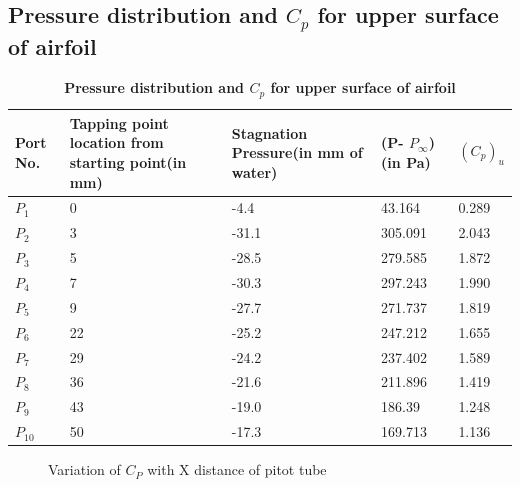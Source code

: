 \documentclass[12pt,a4paper]{article}
\begin{document}
\subsection{Pressure distribution and $C_p$ for upper surface of airfoil }
\begin{table}[ht]
\centering
\caption{\textbf{Pressure distribution and $C_p$ for upper surface of airfoil }}
\vspace{2mm}

\begin{tabular}{|p{10mm}|p{20mm}|p{20mm}|p{20mm}|p{20mm}|} 
 \hline
Port No. & Tapping point location from starting point(in mm) & Stagnation Pressure(in mm of water) & (P- $P_{\infty}$)(in Pa) &  $(C_p)_u$ \\  
 \hline
$P_1$ & 0 & -4.4  & 43.164 & 0.289 \\ 
 \hline
$P_2$ & 3 & -31.1 & 305.091 & 2.043 \\
 \hline
$P_3$ & 5 & -28.5 & 279.585 & 1.872 \\
 \hline
 $P_4$ & 7 & -30.3 & 297.243 & 1.990 \\
 \hline
$P_5$ & 9 & -27.7 & 271.737 & 1.819\\
 \hline
$P_6$ & 22 & -25.2 & 247.212 & 1.655\\ 
 \hline
$P_7$ & 29 & -24.2 & 237.402 & 1.589 \\ 
 \hline
$P_8$ & 36 & -21.6 & 211.896 & 1.419 \\
 \hline
$P_9$ & 43 & -19.0 & 186.39 & 1.248 \\
 \hline
$P_{10}$ & 50 & -17.3 & 169.713 & 1.136 \\ 
 \hline 

\end{tabular}

\end{table}

\begin{figure}[!ht]
	\begin{center}
	\end{center}
	\caption{Variation of $C_P$ with X distance of pitot tube}
\end{figure}
\end{document}
